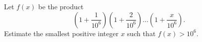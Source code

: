 Let $f(x)$ be the product  \[(1 + \dfrac{1}{10^6}) (1 + \dfrac{2}{10^6})... (1 + \dfrac{x}{10^6}).\]Estimate the smallest positive integer $x$ such that $f(x) > 10^6$.
